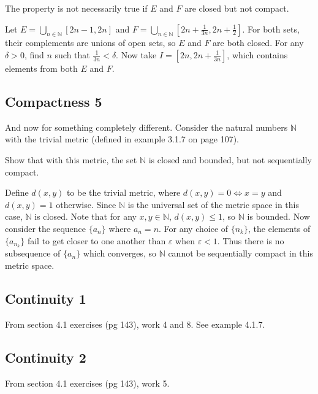 \documentclass[11pt]{article}
\newcommand{\N}{\mathbb{N}}
\begin{document}
The property is not necessarily true if $E$ and $F$ are closed but not
compact. 

Let $E = \bigcup_{n\in\N}[2n-1, 2n]$ and
$F = \bigcup_{n\in\N}[2n+\frac{1}{3n}, 2n+\frac{1}{2}]$. For both sets,
their complements are unions of open sets, so $E$ and $F$ are both closed.
For any $\delta>0$, find $n$ such that $\frac{1}{3n}<\delta$. Now take
$I=[2n,2n+\frac{1}{3n}]$, which contains elements from both $E$ and $F$. 

\subsection*{Compactness 5}

And now for something completely different. Consider the natural numbers $\N$ with the trivial metric (defined in example 3.1.7 on page 107). 

Show that with this metric, the set $\N$ is closed and bounded, but not sequentially compact.

Define $d(x,y)$ to be the trivial metric, where $d(x,y)=0 \iff x=y$ and
$d(x,y) = 1$ otherwise.
Since $\N$ is the universal set of the metric space in this case, $\N$
is closed. Note that for any $x,y\in\N$, $d(x,y)\leq1$, so $\N$ is bounded.
Now consider the sequence $\{a_n\}$ where $a_n = n$. For any choice of
$\{n_k\}$, the elements of $\{a_{n_k}\}$ fail to get closer to one another
than $\varepsilon$ when $\varepsilon<1$. Thus there is no subsequence of
$\{a_n\}$ which converges, so $\N$ cannot be sequentially compact
in this metric space.

\subsection*{Continuity 1}

From section 4.1 exercises (pg 143), work 4 and 8. See example 4.1.7.

\subsection*{Continuity 2}

From section 4.1 exercises (pg 143), work 5.
\end{document}
